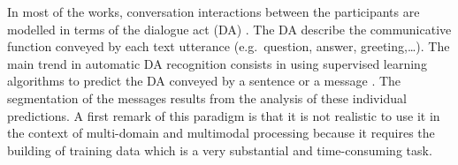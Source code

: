 In most of the works, conversation interactions between the participants are modelled in terms of the dialogue act (DA) \cite{austin:1970}. The DA describe the communicative function conveyed by each text utterance  (e.g.~question, answer, greeting,\ldots).
%
The main trend in automatic DA recognition consists in using supervised learning algorithms to predict the DA conveyed by a sentence or a message \cite{joty:2013:sigdial}.
%
The segmentation of the messages results from the analysis of these individual predictions.
%
A first remark of this paradigm is that it is not realistic to use it in the context of multi-domain and multimodal processing because it requires the building of training data which is a very substantial and time-consuming task.

